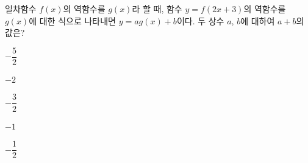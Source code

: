 \hspace*{2mm}\begin{minipage}[t]{\dimexpr\linewidth-2mm\relax}\vspace{0pt}
일차함수 $f(x)$의 역함수를 $g(x)$라 할 때, 함수 $y=f(2x+3)$의 역함수를 $g(x)$에 대한 식으로 나타내면 $y=ag(x)+b$이다. 두 상수 $a$, $b$에 대하여 $a+b$의 값은?
\begin{choices32}{\rule[-3ex]{0pt}{8ex}$-\dfrac{5}{2}$}{\rule[-3ex]{0pt}{8ex}$-2$}{\rule[-3ex]{0pt}{8ex}$-\dfrac{3}{2}$}{\rule[-3ex]{0pt}{8ex}$-1$}{\rule[-3ex]{0pt}{8ex}$-\dfrac{1}{2}$}\end{choices32}\end{minipage}

